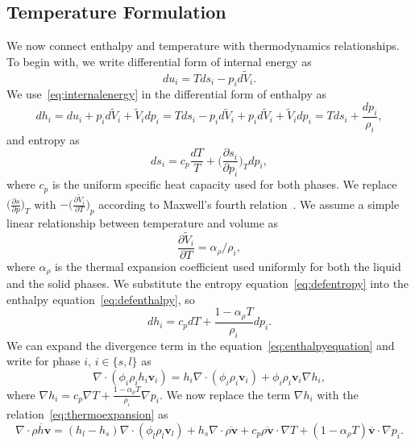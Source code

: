 \subsection{Temperature Formulation}
We now connect enthalpy and temperature with thermodynamics relationships. 
To begin with, 
we write differential form of internal energy as
\begin{equation}\label{eq:internalenergy}
		  du_i = Tds_i - p_id\tilde{V}_i.
\end{equation}
We use~\eqref{eq:internalenergy} in the differential form of enthalpy as
\begin{equation}\label{eq:defenthalpy}
		  dh_i = du_i + p_id\tilde{V}_i + \tilde{V}_idp_i = Tds_i -p_id\tilde{V}_i + p_id\tilde{V}_i + \tilde{V}_idp_i = Tds_i + \frac{dp_i}{\rho_i},
\end{equation}
and entropy as
\begin{equation}\label{eq:defentropy}
ds_i = c_p \frac{dT}{T} + \Big(\frac{\partial s_i}{\partial p_i}\Big)_T dp_i,
\end{equation}
where $c_p$ is the uniform specific heat capacity used for both phases. 
We replace $\big(\frac{\partial s}{\partial p}\big)_T$ 
with $-\big(\frac{\partial \tilde{V}_i}{\partial T}\big)_p$
according to Maxwell's fourth relation~\cite{doi:10.1021/ja01547a094}.
We assume a simple linear relationship between temperature and volume as
\begin{equation}\label{eq:thermoexpansion}
		  \frac{\partial \tilde{V}_i}{\partial T} = \alpha_{\rho} / \rho_i,
\end{equation}
where $\alpha_{\rho}$ is the thermal expansion coefficient used uniformly for both the liquid and
the solid phases. We substitute the entropy equation~\eqref{eq:defentropy}
into the enthalpy equation~\eqref{eq:defenthalpy}, so
\begin{equation}\label{eq:defenthalpy2}
dh_i = c_pdT + \frac{1-\alpha_{\rho}T}{\rho_i} dp_i.
\end{equation}
We can expand the divergence term in the equation~\eqref{eq:enthalpyequation} and write for phase $i$, $i\in\{s,l\}$ as
\begin{equation}
\nabla \cdot (\phi_i \rho_i h_i \mathbf{v}_i) =  h_i \nabla \cdot (\phi_i \rho_i \mathbf{v}_i) +\phi_i \rho_i \mathbf{v}_i \nabla h_i,
\end{equation}
where $\nabla h_i = c_p \nabla T + \frac{1-\alpha_{\rho}T}{\rho_i} \nabla p_i$. We now replace the
term $\nabla h_i$ with the relation~\eqref{eq:thermoexpansion} as
\begin{equation}\label{eq:sum}
\nabla \cdot \overline{\rho h \mathbf{v}} = (h_l - h_s) \nabla \cdot (\phi_l \rho_l \mathbf{v}_l) + h_s \nabla \cdot 
\overline{\rho \mathbf{v}} + c_p \overline{\rho \mathbf{v}} \cdot \nabla T + (1-\alpha_{\rho}T)\overline{\mathbf{v}} \cdot \nabla p_i.
\end{equation}
